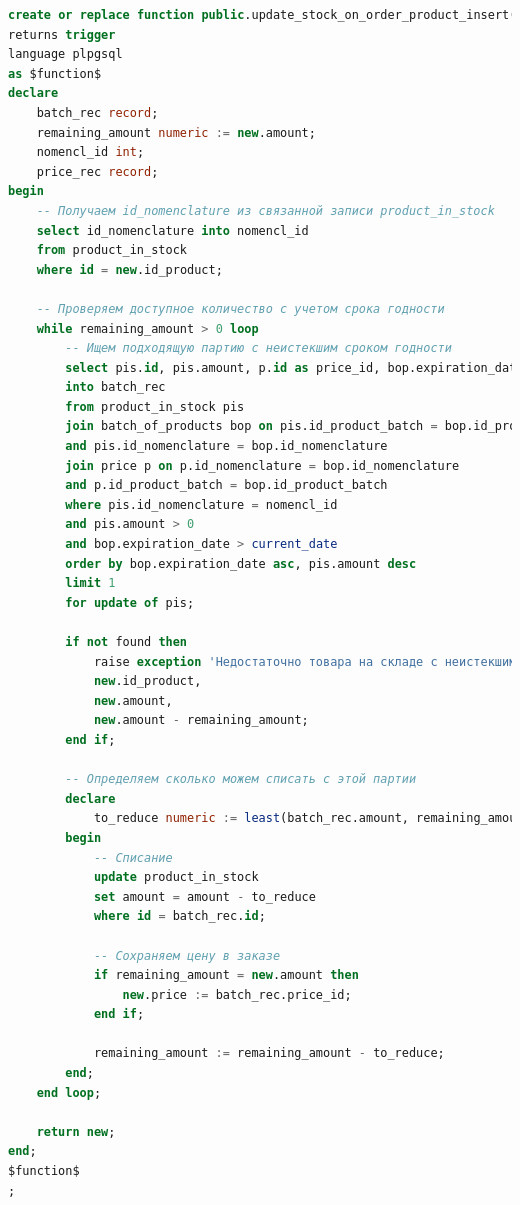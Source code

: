 \begin{lstlisting}[label=lst:trigger2, caption=Создание триггера на обновление товара на складе при покупке, language=SQL]
create or replace function public.update_stock_on_order_product_insert()
returns trigger
language plpgsql
as $function$
declare
	batch_rec record;
	remaining_amount numeric := new.amount;
	nomencl_id int;
	price_rec record;
begin
	-- Получаем id_nomenclature из связанной записи product_in_stock
	select id_nomenclature into nomencl_id 
	from product_in_stock 
	where id = new.id_product;
	
	-- Проверяем доступное количество с учетом срока годности
	while remaining_amount > 0 loop
		-- Ищем подходящую партию с неистекшим сроком годности
		select pis.id, pis.amount, p.id as price_id, bop.expiration_date
		into batch_rec
		from product_in_stock pis
		join batch_of_products bop on pis.id_product_batch = bop.id_product_batch
		and pis.id_nomenclature = bop.id_nomenclature
		join price p on p.id_nomenclature = bop.id_nomenclature
		and p.id_product_batch = bop.id_product_batch
		where pis.id_nomenclature = nomencl_id
		and pis.amount > 0
		and bop.expiration_date > current_date
		order by bop.expiration_date asc, pis.amount desc
		limit 1
		for update of pis;
		
		if not found then
			raise exception 'Недостаточно товара на складе с неистекшим сроком годности. ID товара: %, запрошено: %, осталось: %', 
			new.id_product, 
			new.amount,
			new.amount - remaining_amount;
		end if;
		
		-- Определяем сколько можем списать с этой партии
		declare
			to_reduce numeric := least(batch_rec.amount, remaining_amount);
		begin
			-- Списание
			update product_in_stock
			set amount = amount - to_reduce
			where id = batch_rec.id;
			
			-- Сохраняем цену в заказе
			if remaining_amount = new.amount then
				new.price := batch_rec.price_id;
			end if;
			
			remaining_amount := remaining_amount - to_reduce;
		end;
	end loop;
	
	return new;
end;
$function$
;
\end{lstlisting}

